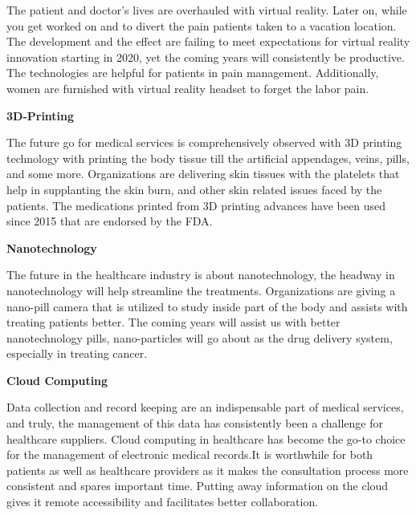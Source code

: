 \documentclass[12pt,a4paper]{report}
\begin{document}
The patient and doctor’s lives are overhauled with virtual reality. Later on, while you get worked on and to divert the pain patients taken to a vacation location. The development and the effect are failing to meet expectations for virtual reality innovation starting in 2020, yet the coming years will consistently be productive. The technologies are helpful for patients in pain management. Additionally, women are furnished with virtual reality headset to forget the labor pain.\par



\begin{center}
  \small{\textbf{3D-Printing}}
\end{center}

 
The future go for medical services is comprehensively observed with 3D printing technology with printing the body tissue till the artificial appendages, veins, pills, and some more. Organizations are delivering skin tissues with the platelets that help in supplanting the skin burn, and other skin related issues faced by the patients. The medications printed from 3D printing advances have been used since 2015 that are endorsed by the FDA.\par

 \begin{center}
  \small{\textbf{Nanotechnology}}
\end{center}

 The future in the healthcare industry is about nanotechnology, the headway in nanotechnology will help streamline the treatments. Organizations are giving a nano-pill camera that is utilized to study inside part of the body and assists with treating patients better. The coming years will assist us with better nanotechnology pills, nano-particles will go about as the drug delivery system, especially in treating cancer.\par

 \begin{center}
  \small{\textbf{Cloud Computing}}
\end{center}

Data collection and record keeping are an indispensable part of medical services, and truly, the management of this data has consistently been a challenge for healthcare suppliers. Cloud computing in healthcare has become the go-to choice for the management of electronic medical records.It is worthwhile for both patients as well as healthcare providers as it makes the consultation process  more consistent and spares important time. Putting away information on the cloud gives it remote accessibility and facilitates better collaboration.\par
\end{document}
